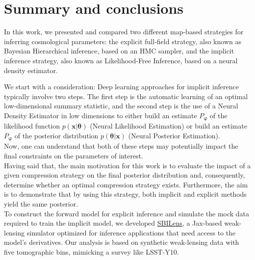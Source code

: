 \documentclass{aa}
\begin{document}
\section{Summary and conclusions}\label{Sec:conclusion}
 In this work, we presented and compared two different map-based strategies for inferring cosmological parameters: the explicit full-field strategy, also known as Bayesian Hierarchical inference, based on an HMC sampler, and the implicit inference strategy, also known as Likelihood-Free Inference, based on a neural density estimator.


We start with a consideration: Deep learning approaches for implicit inference typically involve two steps. The first step is the automatic learning of an optimal low-dimensional summary statistic, and the second step is the use of a Neural Density Estimator in low dimensions to either build an estimate $P_{\bm{\varphi}}$ of the likelihood function $p(\bm{x}|\bm{\theta})$ (Neural Likelihood Estimation) or build an estimate $P_{\bm{\varphi}}$ of the posterior distribution $p(\bm{\theta}|\bm{x})$ (Neural Posterior Estimation). \\
Now, one can understand that both of these steps may potentially impact the final constraints on the parameters of interest. \\
Having said that, the main motivation for this work is to evaluate the impact of a given compression strategy on the final posterior distribution and, consequently, determine whether an optimal compression strategy exists. Furthermore, the aim is to demonstrate that by using this strategy, both implicit and explicit methods yield the same posterior. \\
To construct the forward model for explicit inference and simulate the mock data required to train the implicit model, we developed \href{https://github.com/DifferentiableUniverseInitiative/sbi_lens}{\url{SBILens}}, a Jax-based weak-lensing simulator optimized for inference applications that need access to the model's derivatives. Our analysis is based on synthetic weak-lensing data with five tomographic bins, mimicking a survey like LSST-Y10.
\end{document}
